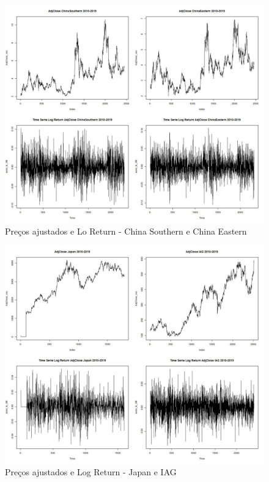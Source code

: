\documentclass[12pt]{article}
\begin{document}
\begin{figure}[H]
	\centering
	\includegraphics[width=0.8\linewidth]{../Modelos/SeriesCompChina10_19}
	\caption{Preços ajustados e Lo Return - China Southern e China Eastern}
	\label{fig:seriescompchina1019}
\end{figure}

\begin{figure}[H]
	\centering
	\includegraphics[width=0.8\linewidth]{../Modelos/SeriesCompJapIAG10_19}
	\caption{Preços ajustados e Log Return - Japan e IAG}
	\label{fig:seriescompjapiag1019}
\end{figure}
\end{document}
